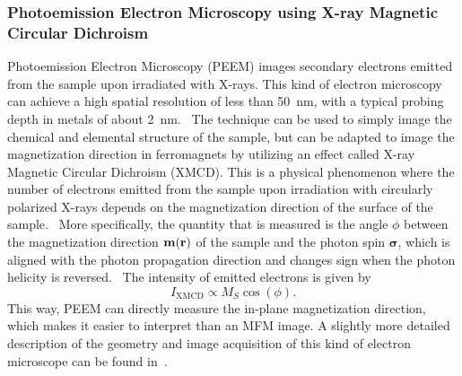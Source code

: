 \documentclass[10pt,a4paper]{article}
\renewcommand{\vec}[1]{\boldsymbol{#1}}
\begin{document}
\subsubsection{Photoemission Electron Microscopy using X-ray Magnetic Circular Dichroism}
Photoemission Electron Microscopy (PEEM) images secondary electrons emitted from the sample upon irradiated with X-rays. This kind of electron microscopy can achieve a high spatial resolution of less than \SI{50}{\nano\metre}, with a typical probing depth in metals of about \SI{2}{\nano\metre}.~\cite{PEEM} The technique can be used to simply image the chemical and elemental structure of the sample, but can be adapted to image the magnetization direction in ferromagnets by utilizing an effect called X-ray Magnetic Circular Dichroism (XMCD). This is a physical phenomenon where the number of electrons emitted from the sample upon irradiation with circularly polarized X-rays depends on the magnetization direction of the surface of the sample.~\cite{NML_Carlton} More specifically, the quantity that is measured is the angle $\phi$ between the magnetization direction $\vb{m(\vb{r})}$ of the sample and the photon spin $\vec{\sigma}$, which is aligned with the photon propagation direction and changes sign when the photon helicity is reversed.~\cite{PEEM} The intensity of emitted electrons is given by
\begin{equation}
    I_{\mathrm{XMCD}} \propto M_S \cos(\phi) \mathrm{.}
    \label{eq:XMCD}
\end{equation}
This way, PEEM can directly measure the in-plane magnetization direction, which makes it easier to interpret than an MFM image. A slightly more detailed description of the geometry and image acquisition of this kind of electron microscope can be found in~\cite{PEEM}. %
\end{document}
